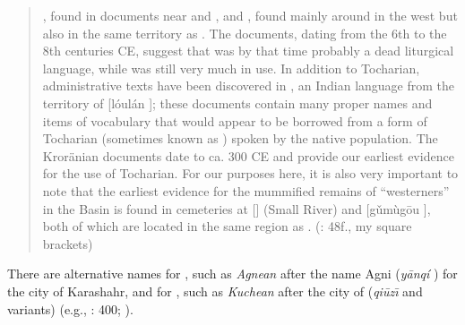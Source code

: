 \begin{quote}
, found in documents near  and , and , found mainly around  in the west but also in the same territory as . The documents, dating from the 6th to the 8th centuries CE, suggest that  was by that time probably a dead liturgical language, while  was still very much in use. In addition to Tocharian, administrative texts have been discovered in , an Indian language from the territory of  [lóulán ]; these documents contain many proper names and items of vocabulary that would appear to be borrowed from a form of Tocharian (sometimes known as ) spoken by the native population. The Kroränian documents date to ca. 300 CE and provide our earliest evidence for the use of Tocharian. For our purposes here, it is also very important to note that the earliest evidence for the mummified remains of “westerners” in the  Basin is found in cemeteries at  [] (Small River) and  [gǔmùg\=ou ], both of which are located in the same region as . (\citealt{Mallory2010}: 48f., my square brackets)
\end{quote}

There are alternative names for , such as \textit{Agnean} after the  name Agni (\textit{y\=anqí} ) for the city of Karashahr, and for , such as \textit{Kuchean} after the city of  (\textit{qiū}\textit{z\={\i}}  and variants) (e.g., \citealt{Fortson2010}: 400; \citealt{GengShimin2012}).

